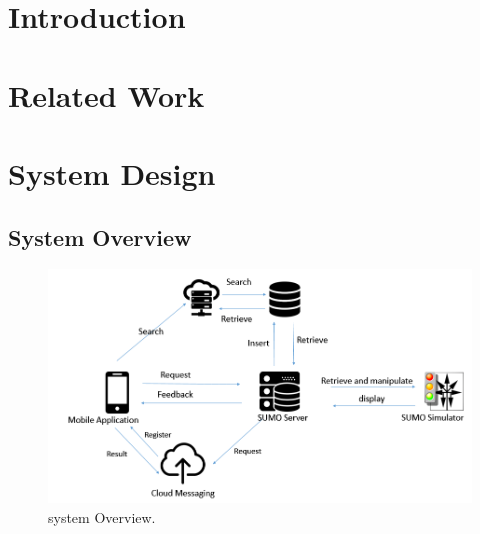 \documentclass[12pt]{ksthesis}
\begin{document}
\begin{thesis}\large {
\chapter{Introduction} \label{Chap:Introduction}



  


\chapter{Related Work} \label{Chap:Related}




\chapter{System Design}\label{Chap:Architecture}

\section{System Overview}

\begin{figure}[H]
\centering
\includegraphics[width=1.0\textwidth]{./figures/F3-1_SystemOverview.PNG}
\caption{\large system Overview.}
\vspace{0.5cm}
\label{Fig:system_Overview}
\end{figure}

}
\end{thesis}
\end{document}
